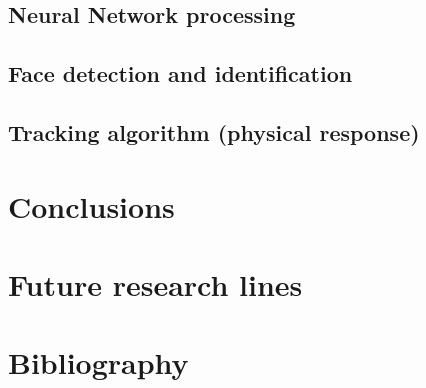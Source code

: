 \section{Neural Network processing}
\section{Face detection and identification}
\section{Tracking algorithm (physical response)}



\chapter{Conclusions}

\chapter{Future research lines}

\chapter{Bibliography}